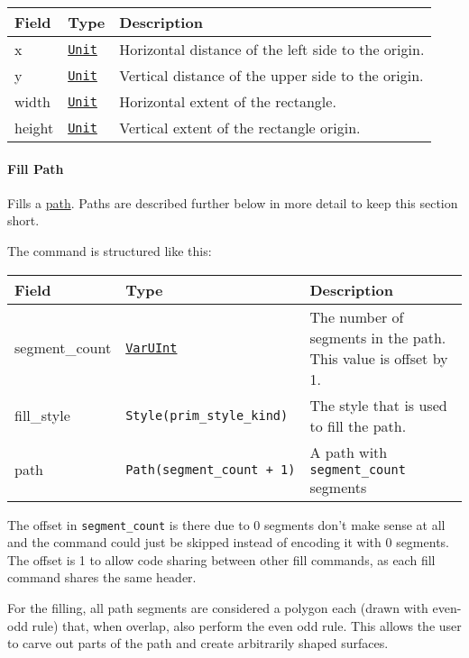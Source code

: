 \documentclass[]{article}
\begin{document}
\begin{longtable}[]{@{}p{1in}p{2in}p{3in}@{}}
\toprule
Field & Type & Description \\
\midrule
\endhead
x & \protect\hyperlink{units}{\texttt{Unit}} & Horizontal distance of the left side to the origin. \\
y & \protect\hyperlink{units}{\texttt{Unit}} & Vertical distance of the upper side to the origin. \\
width & \protect\hyperlink{units}{\texttt{Unit}} & Horizontal extent of the rectangle. \\
height & \protect\hyperlink{units}{\texttt{Unit}} & Vertical extent of the rectangle origin. \\
\bottomrule
\end{longtable}

\hypertarget{fill-path}{\paragraph{Fill Path}\label{fill-path}}

Fills a \protect\hyperlink{path}{path}. Paths are described further
below in more detail to keep this section short.

The command is structured like this:

\begin{longtable}[]{@{}p{1in}p{2in}p{3in}@{}}
\toprule
Field & Type & Description \\
\midrule
\endhead
segment\_count & \protect\hyperlink{varuint}{\texttt{VarUInt}} & The
number of segments in the path. This value is offset by 1. \\
fill\_style & \texttt{Style(prim\_style\_kind)} & The style that is
used to fill the path. \\
path & \texttt{Path(segment\_count\ +\ 1)} & A path with
\texttt{segment\_count} segments \\
\bottomrule
\end{longtable}

The offset in \texttt{segment\_count} is there due to 0 segments don't
make sense at all and the command could just be skipped instead of
encoding it with 0 segments. The offset is 1 to allow code sharing
between other fill commands, as each fill command shares the same
header.

For the filling, all path segments are considered a polygon each (drawn
with even-odd rule) that, when overlap, also perform the even odd rule.
This allows the user to carve out parts of the path and create
arbitrarily shaped surfaces.
\end{document}
